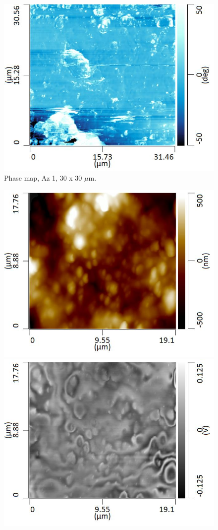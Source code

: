 \begin{figure}[H]
\centering
  \includegraphics[width=.45\textwidth]{Az1_tapping_mode_240521_phase_2}
\caption[Phase map, Az 1]{Phase map, Az 1, 30 x 30 $\mu$m.}
\label{fig:afm_az1_phase_5}
\end{figure}


\begin{figure}[H]
\centering
\begin{minipage}{.45\textwidth}
  \centering
  \includegraphics[width=\linewidth]{Az1_tapping_mode_240521_height_5}
\end{minipage}
\begin{minipage}{.45\textwidth}
  \centering
  \includegraphics[width=\linewidth]{Az1_tapping_mode_240521_def_5}

\end{minipage}
\end{figure}
